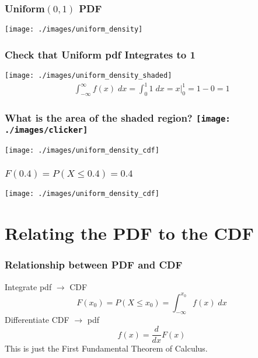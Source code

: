 \begin{frame}
\frametitle{Uniform$(0,1)$ PDF}
\centering
	\texttt{[image: ./images/uniform\_density]}

\end{frame}


\begin{frame}
\frametitle{Check that Uniform pdf Integrates to 1}

\centering
	\texttt{[image: ./images/uniform\_density\_shaded]}
\begin{eqnarray*}
	\int_{-\infty}^{\infty} f(x) \; dx = \int_{0}^1 1 \; dx = \left. x \right|_0^1 = 1 - 0 = 1
\end{eqnarray*}
\end{frame}





\begin{frame}
\frametitle{What is the area of the shaded region? \hfill \texttt{[image: ./images/clicker]}}
\centering
	\texttt{[image: ./images/uniform\_density\_cdf]}

\end{frame}



\begin{frame}
\frametitle{$F(0.4) = P(X\leq 0.4) = 0.4$}
\centering
	\texttt{[image: ./images/uniform\_density\_cdf]}

\end{frame}


\section{Relating the PDF to the CDF}


\begin{frame}
\frametitle{Relationship between PDF and CDF}

Integrate pdf $\rightarrow$ CDF
	$$F(x_0) = P(X\leq x_0) = \int_{-\infty}^{x_0} f(x)\; dx$$
Differentiate CDF $\rightarrow$ pdf
 	$$f(x) =\frac{d}{dx}F(x)$$
\alert{This is just the First Fundamental Theorem of Calculus.}
\end{frame}


